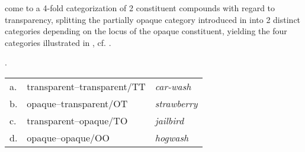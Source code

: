 \citet{Libbenetal:2003} come to a 4-fold categorization of 2 constituent
compounds with regard to transparency, splitting the partially opaque category
introduced in \citet{Zwitserlood:1994} into 2 distinct categories depending
on the locus of the opaque constituent,
yielding the four categories illustrated in \Next,
cf. \citet[53]{Libbenetal:2003}.

\ex. 
\begin{tabular}[t]{lll}
a.&transparent–transparent/TT&\emph{car-wash}\\
b.&opaque–transparent/OT&\emph{strawberry}\\
c.&transparent–opaque/TO&\emph{jailbird}\\
d.&opaque–opaque/OO&\emph{hogwash}
\end{tabular}

